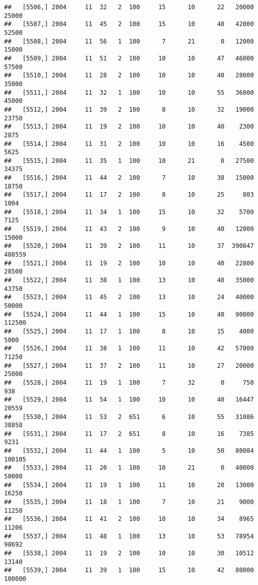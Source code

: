 \documentclass{article}\usepackage[]{graphicx}\usepackage[]{color}
\makeatletter
\newenvironment{kframe}{%
 \def\at@end@of@kframe{}%
 \ifinner\ifhmode%
  \def\at@end@of@kframe{\end{minipage}}%
  \begin{minipage}{\columnwidth}%
 \fi\fi%
 \def\FrameCommand##1{\hskip\@totalleftmargin \hskip-\fboxsep
 \colorbox{shadecolor}{##1}\hskip-\fboxsep
     \hskip-\linewidth \hskip-\@totalleftmargin \hskip\columnwidth}%
 \MakeFramed {\advance\hsize-\width
   \@totalleftmargin\z@ \linewidth\hsize
   \@setminipage}}%
 {\par\unskip\endMakeFramed%
 \at@end@of@kframe}
\newenvironment{knitrout}{}{} %
\makeatother
\begin{document}
\begin{knitrout}
\begin{kframe}
\begin{verbatim}
##   [5506,] 2004     11  32   2  100     15      10      22   20000   25000
##   [5507,] 2004     11  45   2  100     15      10      40   42000   52500
##   [5508,] 2004     11  56   1  100      7      21       0   12000   15000
##   [5509,] 2004     11  51   2  100     10      10      47   46000   57500
##   [5510,] 2004     11  28   2  100     10      10      40   28000   35000
##   [5511,] 2004     11  32   1  100     10      10      55   36000   45000
##   [5512,] 2004     11  39   2  100      8      10      32   19000   23750
##   [5513,] 2004     11  19   2  100     10      10      40    2300    2875
##   [5514,] 2004     11  31   2  100     10      10      16    4500    5625
##   [5515,] 2004     11  35   1  100     10      21       0   27500   34375
##   [5516,] 2004     11  44   2  100      7      10      38   15000   18750
##   [5517,] 2004     11  17   2  100      8      10      25     803    1004
##   [5518,] 2004     11  34   1  100     15      10      32    5700    7125
##   [5519,] 2004     11  43   2  100      9      10      40   12000   15000
##   [5520,] 2004     11  39   2  100     11      10      37  390847  488559
##   [5521,] 2004     11  19   2  100     10      10      40   22800   28500
##   [5522,] 2004     11  38   1  100     13      10      40   35000   43750
##   [5523,] 2004     11  45   2  100     13      10      24   40000   50000
##   [5524,] 2004     11  44   1  100     15      10      40   90000  112500
##   [5525,] 2004     11  17   1  100      8      10      15    4000    5000
##   [5526,] 2004     11  38   1  100     11      10      42   57000   71250
##   [5527,] 2004     11  37   2  100     11      10      27   20000   25000
##   [5528,] 2004     11  19   1  100      7      32       0     750     938
##   [5529,] 2004     11  54   1  100     10      10      40   16447   20559
##   [5530,] 2004     11  53   2  651      6      10      55   31086   38858
##   [5531,] 2004     11  17   2  651      8      10      16    7385    9231
##   [5532,] 2004     11  44   1  100      5      10      50   80084  100105
##   [5533,] 2004     11  20   1  100     10      21       0   40000   50000
##   [5534,] 2004     11  19   1  100     11      10      20   13000   16250
##   [5535,] 2004     11  18   1  100      7      10      21    9000   11250
##   [5536,] 2004     11  41   2  100     10      10      34    8965   11206
##   [5537,] 2004     11  48   1  100     13      10      53   78954   98692
##   [5538,] 2004     11  19   2  100     10      10      30   10512   13140
##   [5539,] 2004     11  39   1  100     15      10      42   80000  100000

\end{verbatim}
\end{kframe}
\end{knitrout}
\end{document}

